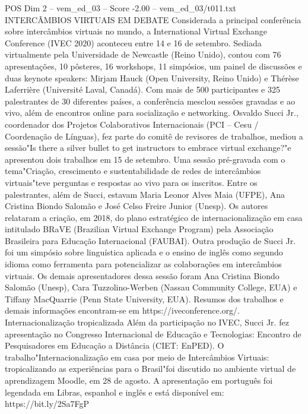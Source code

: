 \begin{textsample}{POS Dim 2 – vem\_ed\_03 – Score -2.00 – vem\_ed\_03/t011.txt}  \label{ex:f2_pos_059}
INTERCÂMBIOS VIRTUAIS EM DEBATE Considerada a principal conferência sobre intercâmbios virtuais no mundo, a International Virtual Exchange Conference (IVEC 2020) aconteceu entre 14 e 16 de setembro.
Sediada virtualmente pela Universidade de Newcastle (Reino Unido), contou com 76 apresentações, 10 pôsteres, 16 workshops, 11 simpósios, um painel de discussões e duas keynote speakers: Mirjam Hauck (Open University, Reino Unido) e Thérèse Laferrière (Université Laval, Canadá).
Com mais de 500 participantes e 325 palestrantes de 30 diferentes países, a conferência mesclou sessões gravadas e ao vivo, além de encontros online para socialização e networking.
Osvaldo Succi Jr., coordenador dos Projetos Colaborativos Internacionais (PCI – Cesu / Coordenação de Línguas), fez parte do comitê de revisores de trabalhos, mediou a sessão"Is there a silver bullet to get instructors to embrace virtual exchange?"e apresentou dois trabalhos em 15 de setembro.
Uma sessão pré-gravada com o tema"Criação, crescimento e sustentabilidade de redes de intercâmbios virtuais"teve perguntas e respostas ao vivo para os inscritos.
Entre os palestrantes, além de Succi, estavam Maria Leonor Alves Maia (UFPE), Ana Cristina Biondo Salomão e José Celso Freire Junior (Unesp).
Os autores relataram a criação, em 2018, do plano estratégico de internacionalização em casa intitulado BRaVE (Brazilian Virtual Exchange Program) pela Associação Brasileira para Educação Internacional (FAUBAI).
Outra produção de Succi Jr. foi um simpósio sobre linguística aplicada e o ensino de inglês como segundo idioma como ferramenta para potencializar as colaborações em intercâmbios virtuais.
Os demais apresentadores dessa sessão foram Ana Cristina Biondo Salomão (Unesp), Cara Tuzzolino-Werben (Nassau Community College, EUA) e Tiffany MacQuarrie (Penn State University, EUA).
Resumos dos trabalhos e demais informações encontram-se em https://iveconference.org/.
Internacionalização tropicalizada Além da participação no IVEC, Succi Jr. fez apresentação no Congresso Internacional de Educação e Tecnologias: Encontro de Pesquisadores em Educação a Distância (CIET: EnPED).
O trabalho"Internacionalização em casa por meio de Intercâmbios Virtuais: tropicalizando as experiências para o Brasil"foi discutido no ambiente virtual de aprendizagem Moodle, em 28 de agosto.
A apresentação em português foi legendada em Libras, espanhol e inglês e está disponível em: https://bit.ly/2Sa7FgP

\end{textsample}
